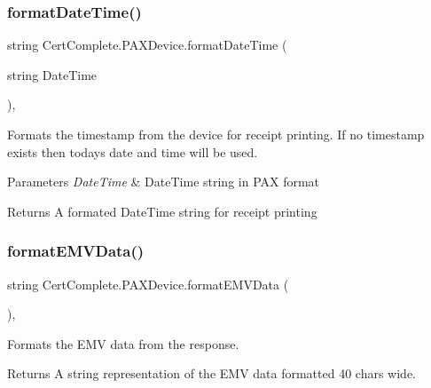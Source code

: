 \subsubsection{\texorpdfstring{format\+Date\+Time()}{formatDateTime()}}
{\footnotesize\ttfamily string Cert\+Complete.\+P\+A\+X\+Device.\+format\+Date\+Time (\begin{DoxyParamCaption}\item[{string}]{Date\+Time }\end{DoxyParamCaption})\hspace{0.3cm}{\ttfamily [inline]}, {\ttfamily [private]}}



Formats the timestamp from the device for receipt printing. If no timestamp exists then todays date and time will be used. 


\begin{DoxyParams}{Parameters}
{\em Date\+Time} & Date\+Time string in P\+AX format\\
\hline
\end{DoxyParams}
\begin{DoxyReturn}{Returns}
A formated Date\+Time string for receipt printing
\end{DoxyReturn}
\mbox{\label{class_cert_complete_1_1_p_a_x_device_a3fa86d4dfd6fde3e513c90edf86a6b4e}} 
\subsubsection{\texorpdfstring{format\+E\+M\+V\+Data()}{formatEMVData()}}
{\footnotesize\ttfamily string Cert\+Complete.\+P\+A\+X\+Device.\+format\+E\+M\+V\+Data (\begin{DoxyParamCaption}{ }\end{DoxyParamCaption})\hspace{0.3cm}{\ttfamily [inline]}, {\ttfamily [private]}}



Formats the E\+MV data from the response. 

\begin{DoxyReturn}{Returns}
A string representation of the E\+MV data formatted 40 chars wide.
\end{DoxyReturn}
\mbox{\label{class_cert_complete_1_1_p_a_x_device_af902321272f9e358d1db15fcf89b413f}} 
